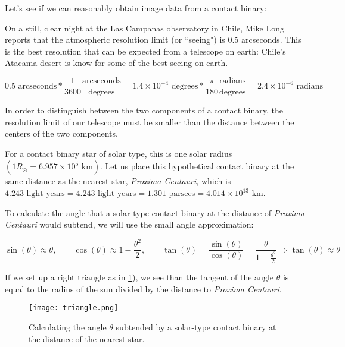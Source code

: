 \documentclass[12pt]{article} %
\numberwithin{equation}{section} %
\begin{document}
Let's see if we can reasonably obtain image data from a contact binary:

On a still, clear night at the Las Campanas observatory in Chile, Mike Long reports that the atmospheric resolution limit (or ``seeing") is 0.5 arcseconds. This is the best resolution that can be expected from a telescope on earth: Chile's Atacama desert is know for some of the best seeing on earth.

\begin{equation} \label{eqn: arcseconds}
0.5 \text{ arcseconds} * \frac{1}{3600} \frac{\text{arcseconds}}{\text{degrees}} = 1.4 \times 10^{-4} \text{ degrees} * \frac{\pi}{180} \frac{\text{radians}}{\text{degrees}} = 2.4 \times 10^{-6} \text{ radians}
\end{equation}

In order to distinguish between the two components of a contact binary, the resolution limit of our telescope must be smaller than the distance between the centers of the two components. 

For a contact binary star of solar type, this is one solar radius $(1 R_{\odot} = 6.957 \times 10^{5} \text{ km})$. Let us place this hypothetical contact binary at the same distance as the nearest star, \emph{Proxima Centauri}, which is $4.243 \text{ light years} = 4.243 \text{ light years} = 1.301 \text{ parsecs} = 4.014 \times 10^{13} \text{ km}$.

To calculate the angle that a solar type-contact binary at the distance of \emph{Proxima Centauri} would subtend, we will use the small angle approximation:

\begin{equation} \label{eqn: smallangle}
\sin(\theta) \approx \theta, \qquad \cos(\theta) \approx 1 - \frac{\theta^{2}}{2}, \qquad \tan(\theta) = \frac{\sin(\theta)}{\cos(\theta)} = \frac{\theta}{1 - \frac{\theta^{2}}{2}} \Rightarrow \tan(\theta) \approx \theta
\end{equation}

If we set up a right triangle as in \ref{fig: triangle}), we see than the tangent of the angle $\theta$ is equal to the radius of the sun divided by the distance to \emph{Proxima Centauri}.

\begin{figure}[H]
\centering
\texttt{[image: triangle.png]}
\caption{Calculating the angle $\theta$ subtended by a solar-type contact binary at the distance of the nearest star.}
\label{fig: triangle}
\end{figure}
\end{document}
